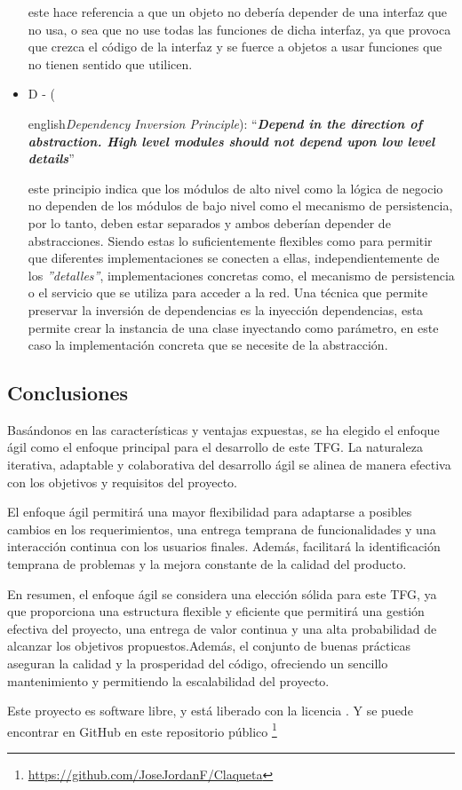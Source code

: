 \begin{itemize}
    este hace referencia a que un objeto no debería depender de una interfaz que no usa, o sea que no use todas las
    funciones de dicha interfaz, ya que provoca que crezca el código de la interfaz y se fuerce a objetos a usar 
    funciones que no tienen sentido que utilicen.
    \item D - (\begin{otherlanguage} {english}\textit{Dependency Inversion Principle}):
    ``\textit{\textbf{Depend in the direction of abstraction. High level modules should not depend upon low level details}}''\end{otherlanguage}
    este principio indica que los módulos de alto nivel como la lógica de negocio no dependen de los 
    módulos de bajo nivel como el mecanismo de persistencia, por lo tanto, deben estar separados y ambos deberían 
    depender de abstracciones. Siendo estas lo suficientemente flexibles como para permitir que diferentes
    implementaciones se conecten a ellas, independientemente de los \textit{''detalles''}, implementaciones concretas 
    como, el mecanismo de persistencia o el servicio que se utiliza para acceder a la red. Una técnica que permite
    preservar la inversión de dependencias es la inyección dependencias, esta permite crear la instancia de una clase 
    inyectando como parámetro, en este caso la implementación concreta que se necesite de la abstracción.
\end{itemize}

\subsection{Conclusiones}

Basándonos en las características y ventajas expuestas, se ha elegido el enfoque ágil como el enfoque 
principal para el desarrollo de este TFG. La naturaleza iterativa, adaptable y colaborativa del 
desarrollo ágil se alinea de manera efectiva con los objetivos y requisitos del proyecto.

El enfoque ágil permitirá una mayor flexibilidad para adaptarse a posibles cambios en los 
requerimientos, una entrega temprana de funcionalidades y una interacción continua con los usuarios 
finales. Además, facilitará la identificación temprana de problemas y la mejora constante de la calidad 
del producto.

En resumen, el enfoque ágil se considera una elección sólida para este TFG, ya que proporciona una 
estructura flexible y eficiente que permitirá una gestión efectiva del proyecto, una entrega de valor 
continua y una alta probabilidad de alcanzar los objetivos propuestos.Además, el conjunto de buenas prácticas 
aseguran la calidad y la prosperidad del código, ofreciendo un sencillo mantenimiento y permitiendo la escalabilidad 
del proyecto.


Este proyecto es software libre, y está liberado con la licencia \cite{gplv3}. Y se puede encontrar en 
GitHub en este repositorio público \footnote{\url{https://github.com/JoseJordanF/Claqueta}}
